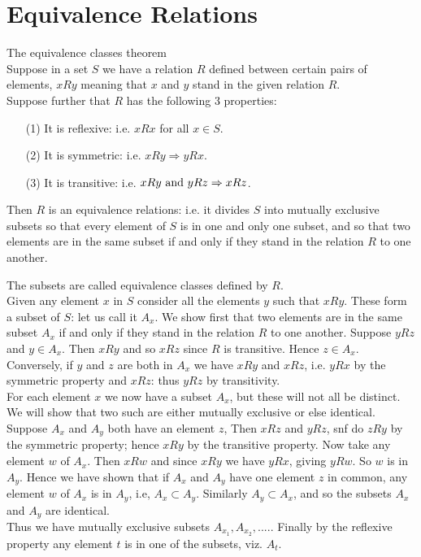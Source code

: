 \section{Equivalence Relations}
\begin{theorem}{The equivalence classes theorem}\\
Suppose in a set $S$ we have a relation $R$ defined between certain pairs of elements, $xRy$ meaning that $x$ and $y$ stand in the given relation $R$.\\
Suppose further that $R$ has the following 3 properties:
\begin{itemize}
\item[(1)] It is reflexive: i.e. $xRx$ for all $x\in S$.
\item[(2)] It is symmetric: i.e. $xRy \Rightarrow yRx$.
\item[(3)] It is transitive: i.e. $xRy  \hbox{ and } yRz  \Rightarrow xRz$.
\end{itemize}
Then $R$ is an equivalence relations: i.e. it divides $S$ into mutually exclusive subsets so that every element of $S$ is in one and only one subset,
and so that two elements are in the same subset if and only if they stand in the relation $R$ to one another.
\end{theorem}
The subsets are called equivalence classes defined by $R$.\\

Given any element $x$ in $S$ consider all the elements $y$ such that $xRy$. These form a subset of $S$: let us call it $A_x$. We show first that two elements are in the same subset
$A_x$ if and only if they stand in the relation $R$ to one another. Suppose $yRz$ and $y\in A_x$. Then $xRy$ and so $xRz$ since $R$ is transitive. Hence $z\in A_x$. Conversely, if $y$ and
$z$ are both in $A_x$ we have $xRy$ and $xRz$, i.e. $yRx$ by the symmetric property and $xRz$: thus $yRz$ by transitivity.\\

For each element $x$ we now have a subset $A_x$, but these will not all be distinct. We will show that two such are either mutually exclusive or else identical. Suppose $A_x$ and $A_y$ both have an 
element $z$, Then $xRz$ and $yRz$, snf do $zRy$ by the symmetric property; hence $xRy$ by the transitive property. Now take any element $w$ of $A_x$. Then $xRw$ and since $xRy$ we have $yRx$, giving
$yRw$. So $w$ is in $A_y$. Hence we have shown that if $A_x$ and $A_y$ have one element $z$ in common, any element $w$ of $A_x$ is in $A_y$, i.e, $A_x \subset A_y$. Similarly $A_y\subset A_x$, 
and so the subsets $A_x$ and $A_y$ are identical.\\
Thus we have mutually exclusive subsets $A_{x_1}, A_{x_2},....$. Finally by the reflexive property any element $t$ is in one of the subsets, viz. $A_t$.
